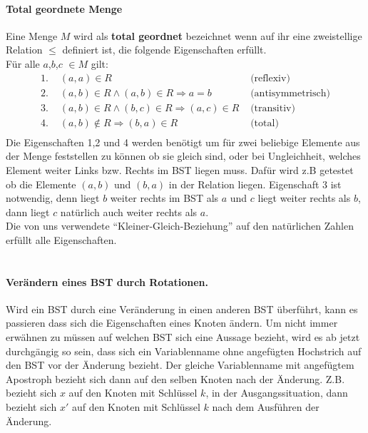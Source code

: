 \documentclass[a4paper,12pt]{article}
\begin{document}
\paragraph{Total geordnete Menge} 
Eine Menge $M$ wird als \textbf{total geordnet} bezeichnet wenn auf ihr eine zweistellige Relation $\leq$ definiert ist, die folgende Eigenschaften erfüllt.\\
Für alle $a$,$b$,$c$ $\in M$ gilt:
\begin{align*}
\text{1. } & (a,a) \in R  &\text{  (reflexiv)}\\
\text{2. } & (a,b) \in R  \land  (a,b) \in R \Rightarrow a = b  &\text{  (antisymmetrisch)}\\
\text{3. } & (a,b) \in R  \land  (b,c) \in R \Rightarrow  (a,c) \in R  &\text{  (transitiv)}\\
\text{4. } & (a,b) \notin R \Rightarrow  (b,a) \in R   &\text{  (total)}\\
\end{align*}
Die Eigenschaften 1,2 und 4 werden benötigt um für zwei beliebige Elemente aus der Menge feststellen zu können ob sie gleich sind, oder bei Ungleichheit, welches Element weiter Links bzw. Rechts im BST liegen muss. Dafür wird z.B getestet ob die Elemente $(a,b)$ und $(b, a)$ in der Relation liegen. Eigenschaft 3 ist notwendig, denn liegt $b$ weiter rechts im BST als $a$ und $c$ liegt weiter rechts als $b$, dann liegt $c$ natürlich auch weiter rechts als $a$. \\
Die von uns verwendete \enquote{Kleiner-Gleich-Beziehung} auf den natürlichen Zahlen erfüllt alle Eigenschaften.
\\
\\




\paragraph{Verändern eines BST durch Rotationen.}
Wird ein BST durch eine Veränderung in einen anderen BST überführt, kann es passieren dass sich die Eigenschaften eines Knoten ändern. Um nicht immer erwähnen zu müssen auf welchen BST sich eine Aussage bezieht, wird es ab jetzt durchgängig so sein, dass sich ein Variablenname ohne angefügten Hochstrich auf den BST vor der Änderung bezieht. Der gleiche Variablenname mit angefügtem Apostroph bezieht sich dann auf den selben Knoten nach der Änderung. Z.B. bezieht sich $x$ auf den Knoten mit Schlüssel $k$, in der Ausgangssituation, dann bezieht sich $x'$ auf den Knoten mit Schlüssel $k$ nach dem Ausführen der Änderung. \\
\end{document}
